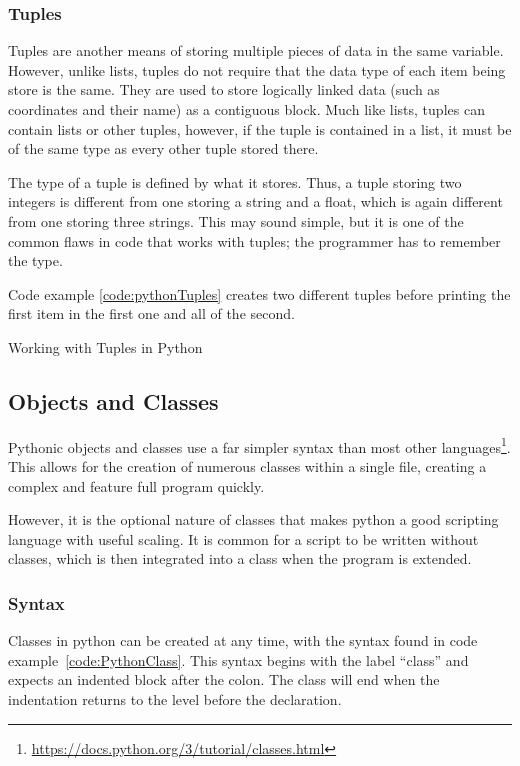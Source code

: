 			\subsubsection{Tuples}
				Tuples are another means of storing multiple pieces of data in the same variable.
				However, unlike lists, tuples do not require that the data type of each item being store is the same.
				They are used to store logically linked data (such as coordinates and their name) as a contiguous block.
				Much like lists, tuples can contain lists or other tuples, however, if the tuple is contained in a list,
				it must be of the same type as every other tuple stored there.

				The type of a tuple is defined by what it stores.
				Thus, a tuple storing two integers is different from one storing a string and a float, which is again different from one storing three strings.
				This may sound simple, but it is one of the common flaws in code that works with tuples; the programmer has to remember the type.

				Code example \ref{code:pythonTuples} creates two different tuples before printing the first item in the first one and all of the second.
				\begin{code}
					\centering
					\caption{Working with Tuples in Python}
					\label{code:pythonTuples}
				\end{code}
		\subsection{Objects and Classes}
			Pythonic objects and classes use a far simpler syntax than most other languages\footnote{\url{https://docs.python.org/3/tutorial/classes.html}}.
			This allows for the creation of numerous classes within a single file, creating a complex and feature full program quickly.

			However, it is the optional nature of classes that makes python a good scripting language with useful scaling.
			It is common for a script to be written without classes, which is then integrated into a class when the program is extended.

			\subsubsection{Syntax}
				Classes in python can be created at any time, with the syntax found in code example~\ref{code:PythonClass}.
				This syntax begins with the label ``class'' and expects an indented block after the colon.
				The class will end when the indentation returns to the level before the declaration.

